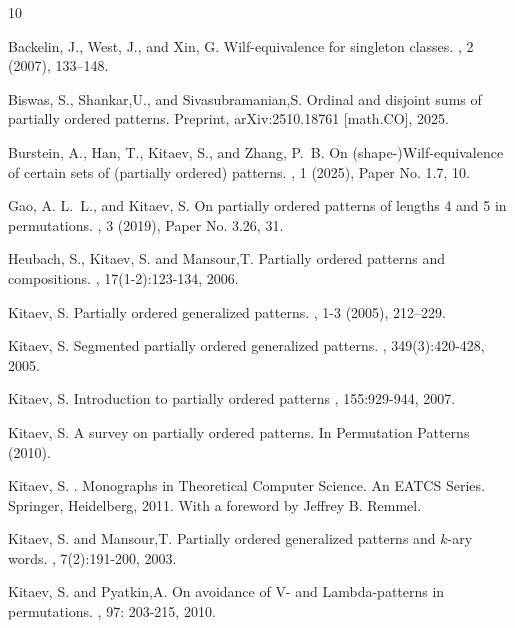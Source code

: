 \documentclass[12pt, english, a4paper]{article}
\theoremstyle{plain}
\theoremstyle{definition}
\theoremstyle{remark}
\begin{document}
\begin{thebibliography}{10}

{\sc Backelin, J., West, J., and Xin, G.}
\newblock Wilf-equivalence for singleton classes.
, 2 (2007), 133--148.

{\sc Biswas, S., Shankar,U., and Sivasubramanian,S.}
\newblock Ordinal and disjoint sums of partially ordered patterns.
\newblock Preprint, {arXiv}:2510.18761 [math.{CO}], 2025.

{\sc Burstein, A., Han, T., Kitaev, S., and Zhang, P.~B.}
\newblock On (shape-){W}ilf-equivalence of certain sets of (partially ordered) patterns.
, 1 (2025), Paper No. 1.7, 10.

{\sc Gao, A. L.~L., and Kitaev, S.}
\newblock On partially ordered patterns of lengths 4 and 5 in permutations.
, 3 (2019), Paper No. 3.26, 31.

{\sc Heubach, S., Kitaev, S. and Mansour,T.}
\newblock Partially ordered patterns and compositions.
, 17(1-2):123-134, 2006.

{\sc Kitaev, S.}
\newblock Partially ordered generalized patterns.
, 1-3 (2005), 212--229.

{\sc Kitaev, S.}
\newblock Segmented partially ordered generalized patterns.
, 349(3):420-428, 2005.

{\sc Kitaev, S.}
\newblock Introduction to partially ordered patterns
, 155:929-944, 2007.

{\sc Kitaev, S.}
\newblock A survey on partially ordered patterns. In Permutation Patterns (2010).


{\sc Kitaev, S.}
.
\newblock Monographs in Theoretical Computer Science. An EATCS Series. Springer, Heidelberg, 2011.
\newblock With a foreword by Jeffrey B. Remmel.

{\sc  Kitaev, S. and Mansour,T.}
\newblock Partially ordered generalized patterns and $k$-ary words.
, 7(2):191-200, 2003.

{\sc  Kitaev, S. and Pyatkin,A.}
\newblock On avoidance of V- and Lambda-patterns in permutations.
, 97: 203-215, 2010.


\end{thebibliography}
\end{document}
